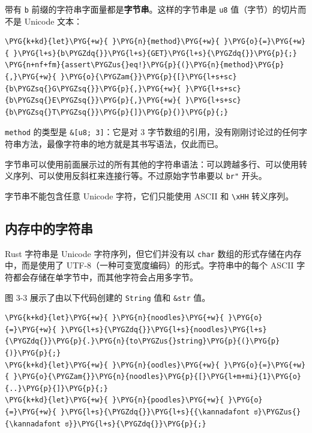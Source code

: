 带有 \texttt{b} 前缀的字符串字面量都是\textbf{字节串}。这样的字节串是 \texttt{u8} 值（字节）的切片而不是 Unicode 文本：

\begin{Verbatim}[commandchars=\\\{\},breaklines=true,breakanywhere=true,fontsize=\codefont,xleftmargin=17bp]
\PYG{k+kd}{let}\PYG{+w}{ }\PYG{n}{method}\PYG{+w}{ }\PYG{o}{=}\PYG{+w}{ }\PYG{l+s}{b\PYGZdq{}}\PYG{l+s}{GET}\PYG{l+s}{\PYGZdq{}}\PYG{p}{;}
\PYG{n+nf+fm}{assert\PYGZus{}eq!}\PYG{p}{(}\PYG{n}{method}\PYG{p}{,}\PYG{+w}{ }\PYG{o}{\PYGZam{}}\PYG{p}{[}\PYG{l+s+sc}{b\PYGZsq{}G\PYGZsq{}}\PYG{p}{,}\PYG{+w}{ }\PYG{l+s+sc}{b\PYGZsq{}E\PYGZsq{}}\PYG{p}{,}\PYG{+w}{ }\PYG{l+s+sc}{b\PYGZsq{}T\PYGZsq{}}\PYG{p}{]}\PYG{p}{)}\PYG{p}{;}
\end{Verbatim}

\texttt{method} 的类型是 \texttt{\&[u8; 3]}：它是对 3 字节数组的引用，没有刚刚讨论过的任何字符串方法，最像字符串的地方就是其书写语法，仅此而已。

字节串可以使用前面展示过的所有其他的字符串语法：可以跨越多行、可以使用转义序列、可以使用反斜杠来连接行等。不过原始字节串要以 \texttt{br"} 开头。

字节串不能包含任意 Unicode 字符，它们只能使用 ASCII 和 \texttt{\textbackslash{}xHH} 转义序列。

\subsection{内存中的字符串}

Rust 字符串是 Unicode 字符序列，但它们并没有以 \texttt{char} 数组的形式存储在内存中，而是使用了 UTF-8（一种可变宽度编码）的形式。字符串中的每个 ASCII 字符都会存储在单字节中，而其他字符会占用多字节。

图 3-3 展示了由以下代码创建的 \texttt{String} 值和 \texttt{\&str} 值。

\begin{Verbatim}[commandchars=\\\{\},breaklines=true,breakanywhere=true,fontsize=\codefont,xleftmargin=17bp]
\PYG{k+kd}{let}\PYG{+w}{ }\PYG{n}{noodles}\PYG{+w}{ }\PYG{o}{=}\PYG{+w}{ }\PYG{l+s}{\PYGZdq{}}\PYG{l+s}{noodles}\PYG{l+s}{\PYGZdq{}}\PYG{p}{.}\PYG{n}{to\PYGZus{}string}\PYG{p}{(}\PYG{p}{)}\PYG{p}{;}
\PYG{k+kd}{let}\PYG{+w}{ }\PYG{n}{oodles}\PYG{+w}{ }\PYG{o}{=}\PYG{+w}{ }\PYG{o}{\PYGZam{}}\PYG{n}{noodles}\PYG{p}{[}\PYG{l+m+mi}{1}\PYG{o}{..}\PYG{p}{]}\PYG{p}{;}
\PYG{k+kd}{let}\PYG{+w}{ }\PYG{n}{poodles}\PYG{+w}{ }\PYG{o}{=}\PYG{+w}{ }\PYG{l+s}{\PYGZdq{}}\PYG{l+s}{{\kannadafont ಠ}\PYGZus{}{\kannadafont ಠ}}\PYG{l+s}{\PYGZdq{}}\PYG{p}{;}
\end{Verbatim}


